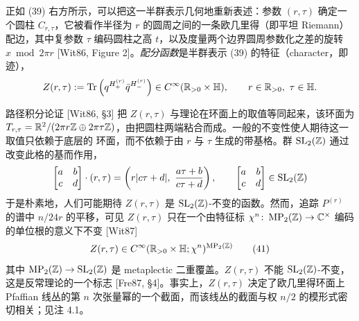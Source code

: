 
正如 (39) 右方所示，可以把这一半群表示几何地重新表述：参数 $(r,\tau)$ 确定一个圆柱 $C_{r,\tau}$，它被看作半径为 $r$ 的圆周之间的一条欧几里得（即平坦 Riemann）配边，其中复参数 $\tau$ 编码圆柱之高 $t$，以及度量两个边界圆周参数化之差的旋转 $x\bmod 2\pi r$ [Wit86, Figure 2]。\emph{配分函数}是半群表示 (39) 的特征（character，即迹），
\[
Z(r,\tau):=\operatorname{Tr}\left(q^{H^{(r)}_+}\bar q^{H^{(r)}_-}\right)\in C^\infty(\mathbb{R}_{>0}\times\mathbb{H}),\qquad r\in\mathbb{R}_{>0},\ \tau\in\mathbb{H}.
\]

路径积分论证 [Wit86, §3] 把 $Z(r,\tau)$ 与理论在环面上的取值等同起来，该环面为 $T_{r,\tau}=\mathbb{R}^2/(2\pi r\mathbb{Z}\oplus 2\pi\tau\mathbb{Z})$，由把圆柱两端粘合而成。一般的不变性使人期待这一取值只依赖于底层的%
环面，而不依赖于由 $r$ 与 $\tau$ 生成的带基格。群 $\mathrm{SL}_2(\mathbb{Z})$ 通过改变此格的基而作用，
\[
\begin{bmatrix} a & b\\ c & d \end{bmatrix}\cdot(r,\tau)=\left(r|c\tau+d|,\ \frac{a\tau+b}{c\tau+d}\right),\qquad \begin{bmatrix} a & b\\ c & d \end{bmatrix}\in\mathrm{SL}_2(\Z)
\]
于是朴素地，人们可能期待 $Z(r,\tau)$ 是 $\mathrm{SL}_2(\mathbb{Z})$-不变的函数。然而，追踪 $P^{(r)}$ 的谱中 $n/24r$ 的平移，可见 $Z(r,\tau)$ 只在一个由特征标 $\chi^n\colon\operatorname{MP}_2(\mathbb{Z})\to\mathbb{C}^\times$ 编码的单位根的意义下不变 [Wit87]
\begin{equation}
Z(r,\tau)\in C^\infty(\mathbb{R}_{>0}\times\mathbb{H};\chi^n)^{\operatorname{MP}_2(\mathbb{Z})}
\tag{41}
\end{equation}
其中 $\operatorname{MP}_2(\mathbb{Z})\to\mathrm{SL}_2(\mathbb{Z})$ 是 metaplectic 二重覆盖。$Z(r,\tau)$ 不能 $\mathrm{SL}_2(\mathbb{Z})$-不变，这是反常理论的一个标志 [Fre87, §4]。事实上，$Z(r,\tau)$ 决定了欧几里得环面上 Pfaffian 线丛的第 $n$ 次张量幂的一个截面，而该线丛的截面与权 $n/2$ 的模形式密切相关；见注 4.1。


